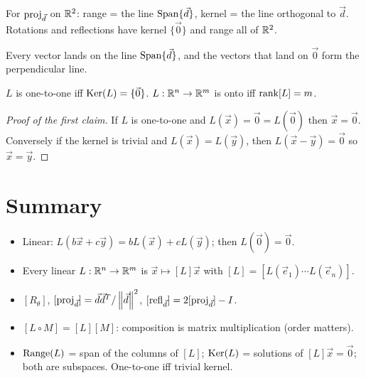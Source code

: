 \begin{important}
For $\operatorname{proj}_{\vec d}$ on $\mathbb{R}^2$: range = the line $\operatorname{Span}\{\vec d\}$, kernel = the line orthogonal to
$\vec d$. Rotations and reflections have kernel $\{\vec0\}$ and range all of $\mathbb{R}^2$.
\end{important}

\begin{center}
\end{center}
Every vector lands on the line $\operatorname{Span}\{\vec d\}$, and the vectors that land on $\vec 0$ form the
perpendicular line.

\begin{theorem}
$L$ is one-to-one iff $\operatorname{Ker}(L)=\{\vec 0\}$. $L:\mathbb{R}^n\to\mathbb{R}^m$ is onto iff $\operatorname{rank}[L]=m$.
\end{theorem}
\begin{proof}[Proof of the first claim]
If $L$ is one-to-one and $L(\vec x)=\vec 0=L(\vec 0)$ then $\vec x=\vec 0$. Conversely if the kernel
is trivial and $L(\vec x)=L(\vec y)$, then $L(\vec x-\vec y)=\vec 0$ so $\vec x=\vec y$.
\end{proof}

\section*{Summary}
\begin{itemize}
  \item Linear: $L(b\vec x+c\vec y)=bL(\vec x)+cL(\vec y)$; then $L(\vec0)=\vec0$.
  \item Every linear $L:\mathbb{R}^n\to\mathbb{R}^m$ is $\vec x\mapsto[L]\vec x$ with $[L]=[L(\vec e_1)\cdots L(\vec e_n)]$.
  \item $[R_\theta]$, $[\operatorname{proj}_{\vec d}]=\vec d\vec d^T/\left\lVert \vec d \right\rVert^2$, $[\operatorname{refl}_{\vec d}]=2[\operatorname{proj}_{\vec d}]-I$.
  \item $[L\circ M]=[L][M]$: composition is matrix multiplication (order matters).
  \item $\operatorname{Range}(L)$ = span of the columns of $[L]$; $\operatorname{Ker}(L)$ = solutions of $[L]\vec x=\vec0$; both
        are subspaces. One-to-one iff trivial kernel.
\end{itemize}

